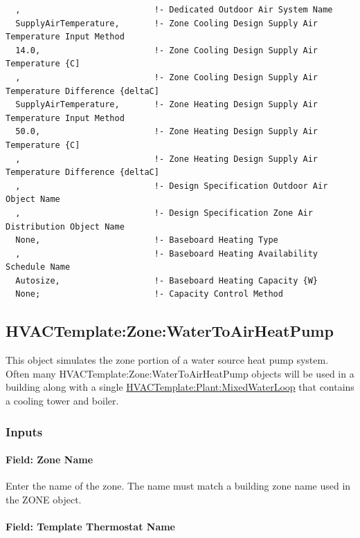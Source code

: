 \begin{lstlisting}
  ,                           !- Dedicated Outdoor Air System Name
  SupplyAirTemperature,       !- Zone Cooling Design Supply Air Temperature Input Method
  14.0,                       !- Zone Cooling Design Supply Air Temperature {C]
  ,                           !- Zone Cooling Design Supply Air Temperature Difference {deltaC]
  SupplyAirTemperature,       !- Zone Heating Design Supply Air Temperature Input Method
  50.0,                       !- Zone Heating Design Supply Air Temperature {C]
  ,                           !- Zone Heating Design Supply Air Temperature Difference {deltaC]
  ,                           !- Design Specification Outdoor Air Object Name
  ,                           !- Design Specification Zone Air Distribution Object Name
  None,                       !- Baseboard Heating Type
  ,                           !- Baseboard Heating Availability Schedule Name
  Autosize,                   !- Baseboard Heating Capacity {W}
  None;                       !- Capacity Control Method
\end{lstlisting}

\subsection{HVACTemplate:Zone:WaterToAirHeatPump}\label{hvactemplatezonewatertoairheatpump}

This object simulates the zone portion of a water source heat pump system. Often many HVACTemplate:Zone:WaterToAirHeatPump objects will be used in a building along with a single \hyperref[hvactemplateplantmixedwaterloop]{HVACTemplate:Plant:MixedWaterLoop} that contains a cooling tower and boiler.

\subsubsection{Inputs}\label{inputs-6-011}

\paragraph{Field: Zone Name}\label{field-zone-name-5-001}

Enter the name of the zone. The name must match a building zone name used in the ZONE object.

\paragraph{Field: Template Thermostat Name}\label{field-template-thermostat-name-5}

